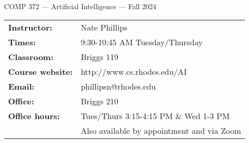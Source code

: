 \documentclass [letterpaper,11pt]{article}
\begin{document}
\begin{center}
\large COMP 372 --- Artificial Intelligence --- Fall 2024
\end{center}

\noindent\begin{tabular}{@{}ll}
\textbf{Instructor:} & Nate Phillips \\
\textbf{Times:} & 9:30-10:45 AM Tuesday/Thursday\\
\textbf{Classroom:} & Briggs 119 \\
\textbf{Course website:} & http://www.cs.rhodes.edu/AI\\
\textbf{Email:} &phillipsn@rhodes.edu\\
\textbf{Office:} & Briggs 210\\
\textbf{Office hours:} & Tues/Thurs 3:15-4:15 PM \& Wed 1-3 PM \\ &Also available by appointment and via Zoom\\
\end{tabular}
\end{document}
